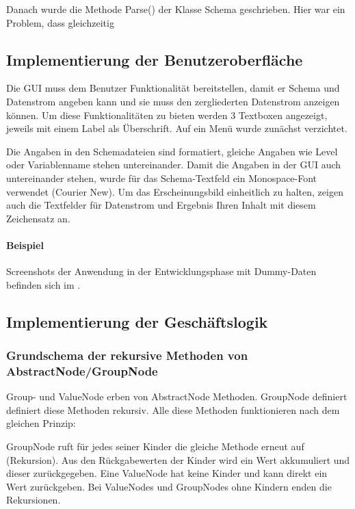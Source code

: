 Danach wurde die Methode Parse() der Klasse Schema geschrieben. Hier war ein Problem, dass gleichzeitig 


\subsection{Implementierung der Benutzeroberfläche}
\label{sec:ImplementierungBenutzeroberflaeche}
Die \ac{GUI} muss dem Benutzer Funktionalität bereitstellen, damit er Schema und Datenstrom angeben kann und sie muss den zergliederten Datenstrom anzeigen können.
Um diese Funktionalitäten zu bieten werden 3 Textboxen angezeigt, jeweils mit einem Label als Überschrift. Auf ein Menü wurde zunächst verzichtet.

Die Angaben in den Schemadateien sind formatiert, gleiche Angaben wie Level oder Variablenname stehen untereinander. Damit die Angaben in der GUI auch untereinander stehen, wurde für das Schema-Textfeld ein Monospace-Font verwendet (Courier New). Um das Erscheinungsbild einheitlich zu halten, zeigen auch die Textfelder für Datenstrom und Ergebnis Ihren Inhalt mit diesem Zeichensatz an.
\paragraph{Beispiel}
Screenshots der Anwendung in der Entwicklungsphase mit Dummy-Daten befinden sich im .


\subsection{Implementierung der Geschäftslogik}
\label{sec:ImplementierungGeschaeftslogik}

\subsubsection{Grundschema der rekursive Methoden von AbstractNode/GroupNode}
Group- und ValueNode erben von AbstractNode Methoden. GroupNode definiert definiert diese Methoden rekursiv. Alle diese Methoden funktionieren nach dem gleichen Prinzip:

GroupNode ruft für jedes seiner Kinder die gleiche Methode erneut auf (Rekursion). Aus den Rückgabewerten der Kinder wird ein Wert akkumuliert und dieser zurückgegeben.
Eine ValueNode hat keine Kinder und kann direkt ein Wert zurückgeben. Bei ValueNodes und GroupNodes ohne Kindern enden die Rekursionen.



